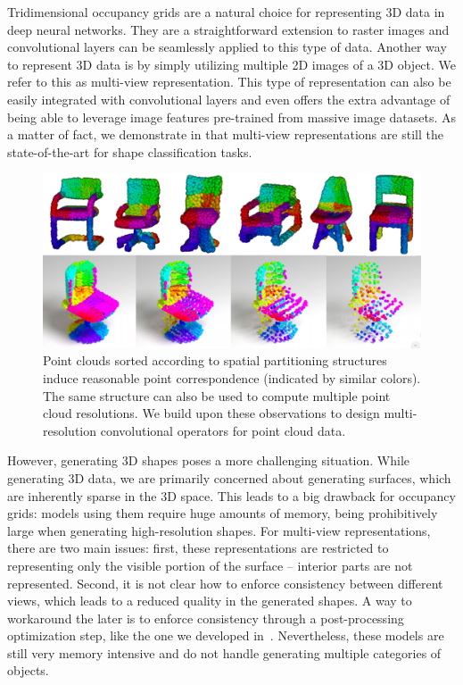 Tridimensional occupancy grids are a natural choice for representing 3D data in deep neural networks.
They are a straightforward extension to raster images and convolutional layers can be seamlessly
applied to this type of data.
Another way to represent 3D data is by simply utilizing multiple 2D images of a 3D object.
We refer to this as multi-view representation.
This type of representation can also be easily integrated with convolutional layers and even
offers the extra advantage of being able to leverage image features pre-trained from massive image
datasets.
As a matter of fact, we demonstrate in \cite{shapeclassifiers} that multi-view representations are still the
state-of-the-art for shape classification tasks.

\begin{figure}
 \begin{center}
 \includegraphics[width=\linewidth]{figs/shapepartition.png}
 \end{center}
 \vspace{-20pt}
 \caption{\small Point clouds sorted according to spatial partitioning structures induce
 reasonable point correspondence (indicated by similar colors).
 The same structure can also be used to compute multiple point cloud resolutions.
 We build upon these observations to design multi-resolution convolutional operators
 for point cloud data.}
\end{figure}

However, generating 3D shapes poses a more challenging situation.
While generating 3D data, we are primarily concerned about generating surfaces, which are
inherently sparse in the 3D space.
This leads to a big drawback for occupancy grids: models using them require huge amounts of memory,
being prohibitively large when generating high-resolution shapes.
For multi-view representations, there are two main issues:
first, these representations are restricted to representing only the visible portion of the surface --
interior parts are not represented.
Second, it is not clear how to enforce consistency between different views, which leads to a reduced quality in the generated shapes.
A way to workaround the later is to enforce consistency through a post-processing optimization step, like the one we developed in~\cite{sketch}.
Nevertheless, these models are still very memory intensive and do not handle generating
multiple categories of objects.

